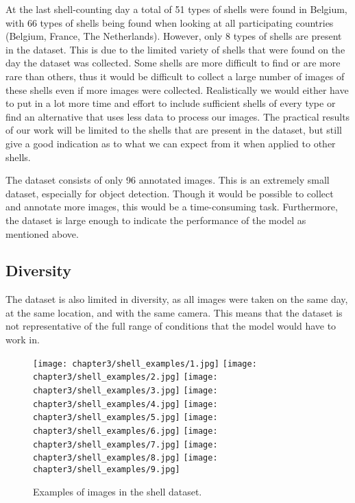 At the last shell-counting day a total of 51 types of shells were found in Belgium, with 66 types of shells being found when looking at all participating countries (Belgium, France, The Netherlands). However, only 8 types of shells are present in the dataset. This is due to the limited variety of shells that were found on the day the dataset was collected. Some shells are more difficult to find or are more rare than others, thus it would be difficult to collect a large number of images of these shells even if more images were collected. Realistically we would either have to put in a lot more time and effort to include sufficient shells of every type or find an alternative that uses less data to process our images. The practical results of our work will be limited to the shells that are present in the dataset, but still give a good indication as to what we can expect from it when applied to other shells.

The dataset consists of only 96 annotated images. This is an extremely small dataset, especially for object detection. Though it would be possible to collect and annotate more images, this would be a time-consuming task. Furthermore, the dataset is large enough to indicate the performance of the model as mentioned above.

\subsection*{Diversity}

The dataset is also limited in diversity, as all images were taken on the same day, at the same location, and with the same camera. This means that the dataset is not representative of the full range of conditions that the model would have to work in.


\begin{figure}[H]
    \centering
    \captionsetup{justification=centering}
    \texttt{[image: chapter3/shell\_examples/1.jpg]} 
    \texttt{[image: chapter3/shell\_examples/2.jpg]} 
    \texttt{[image: chapter3/shell\_examples/3.jpg]}
    \texttt{[image: chapter3/shell\_examples/4.jpg]} 
    \texttt{[image: chapter3/shell\_examples/5.jpg]} 
    \texttt{[image: chapter3/shell\_examples/6.jpg]}
    \texttt{[image: chapter3/shell\_examples/7.jpg]}
    \texttt{[image: chapter3/shell\_examples/8.jpg]}
    \texttt{[image: chapter3/shell\_examples/9.jpg]}
    \caption{Examples of images in the shell dataset.}
    \label{tab:shell_examples}
\end{figure}